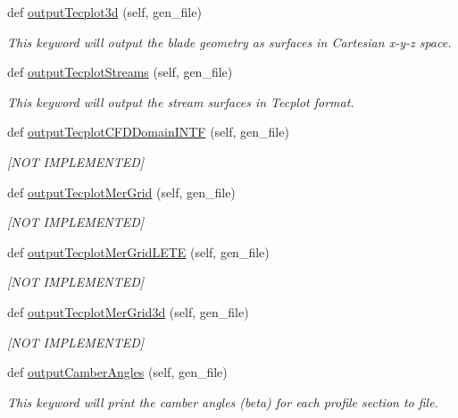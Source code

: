 \begin{DoxyCompactItemize}
def \hyperlink{a00073_a33919a9fe9364387c8f96fa21c35d2e8}{output\+Tecplot3d} (self, gen\+\_\+file)
\begin{DoxyCompactList}\small\item\em This keyword will output the blade geometry as surfaces in Cartesian x-\/y-\/z space. \end{DoxyCompactList}\item 
def \hyperlink{a00073_adb8d68c4190d41bd93a2988562f6495b}{output\+Tecplot\+Streams} (self, gen\+\_\+file)
\begin{DoxyCompactList}\small\item\em This keyword will output the stream surfaces in Tecplot format. \end{DoxyCompactList}\item 
def \hyperlink{a00073_ab3fe3d49e2e140068cb5b3b25964919f}{output\+Tecplot\+C\+F\+D\+Domain\+I\+N\+TF} (self, gen\+\_\+file)
\begin{DoxyCompactList}\small\item\em \mbox{[}N\+OT I\+M\+P\+L\+E\+M\+E\+N\+T\+ED\mbox{]} \end{DoxyCompactList}\item 
def \hyperlink{a00073_a735d8bff1d58f17130859af0f97dfbd7}{output\+Tecplot\+Mer\+Grid} (self, gen\+\_\+file)
\begin{DoxyCompactList}\small\item\em \mbox{[}N\+OT I\+M\+P\+L\+E\+M\+E\+N\+T\+ED\mbox{]} \end{DoxyCompactList}\item 
def \hyperlink{a00073_a504ccb848106dd7a0a4148941e2ec6d9}{output\+Tecplot\+Mer\+Grid\+L\+E\+TE} (self, gen\+\_\+file)
\begin{DoxyCompactList}\small\item\em \mbox{[}N\+OT I\+M\+P\+L\+E\+M\+E\+N\+T\+ED\mbox{]} \end{DoxyCompactList}\item 
def \hyperlink{a00073_a4ea4c17b862c49ad9c51398fa9d60dbc}{output\+Tecplot\+Mer\+Grid3d} (self, gen\+\_\+file)
\begin{DoxyCompactList}\small\item\em \mbox{[}N\+OT I\+M\+P\+L\+E\+M\+E\+N\+T\+ED\mbox{]} \end{DoxyCompactList}\item 
def \hyperlink{a00073_ab5d0d97e4bf1dd0ddf28f4f537fea598}{output\+Camber\+Angles} (self, gen\+\_\+file)
\begin{DoxyCompactList}\small\item\em This keyword will print the camber angles (beta) for each profile section to file. \end{DoxyCompactList}\item 

\end{DoxyCompactItemize}
